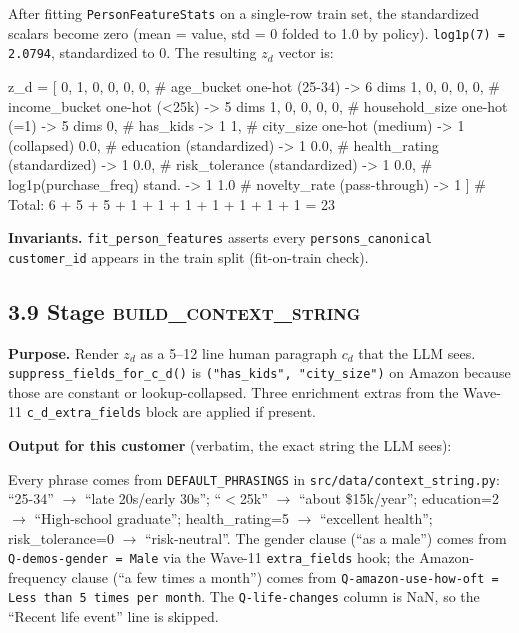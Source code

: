 \documentclass[11pt,a4paper]{article}
\begin{document}
After fitting \texttt{PersonFeatureStats} on a single-row train set,
the standardized scalars become zero (mean = value, std = 0 folded to
1.0 by policy). \texttt{log1p(7) = 2.0794}, standardized to $0$. The
resulting $z_d$ vector is:

\begin{code}
z_d = [
  0, 1, 0, 0, 0, 0,      # age_bucket one-hot (25-34)    -> 6 dims
  1, 0, 0, 0, 0,         # income_bucket one-hot (<25k)  -> 5 dims
  1, 0, 0, 0, 0,         # household_size one-hot (=1)   -> 5 dims
  0,                     # has_kids                      -> 1
  1,                     # city_size one-hot (medium)    -> 1 (collapsed)
  0.0,                   # education (standardized)      -> 1
  0.0,                   # health_rating (standardized)  -> 1
  0.0,                   # risk_tolerance (standardized) -> 1
  0.0,                   # log1p(purchase_freq) stand.   -> 1
  1.0                    # novelty_rate (pass-through)   -> 1
]
# Total: 6 + 5 + 5 + 1 + 1 + 1 + 1 + 1 + 1 + 1 = 23
\end{code}

\textbf{Invariants.} \texttt{fit\_person\_features} asserts every
\texttt{persons\_canonical} \texttt{customer\_id} appears in the train
split (fit-on-train check).

\subsection*{3.9 Stage \textsc{build\_context\_string}}

\textbf{Purpose.} Render $z_d$ as a 5--12 line human paragraph $c_d$
that the LLM sees. \texttt{suppress\_fields\_for\_c\_d()} is
\verb|("has_kids", "city_size")| on Amazon because those are constant
or lookup-collapsed. Three enrichment extras from the Wave-11
\texttt{c\_d\_extra\_fields} block are applied if present.

\textbf{Output for this customer} (verbatim, the exact string the LLM
sees):


Every phrase comes from \texttt{DEFAULT\_PHRASINGS} in
\texttt{src/data/context\_string.py}: ``25-34'' $\to$ ``late 20s/early
30s''; ``$<$25k'' $\to$ ``about \$15k/year''; education=2 $\to$
``High-school graduate''; health\_rating=5 $\to$ ``excellent health'';
risk\_tolerance=0 $\to$ ``risk-neutral''. The gender clause
(``as a male'') comes from \texttt{Q-demos-gender = Male} via the
Wave-11 \texttt{extra\_fields} hook; the Amazon-frequency clause
(``a few times a month'') comes from
\texttt{Q-amazon-use-how-oft = Less than 5 times per month}. The
\texttt{Q-life-changes} column is NaN, so the ``Recent life event''
line is skipped.
\end{document}
